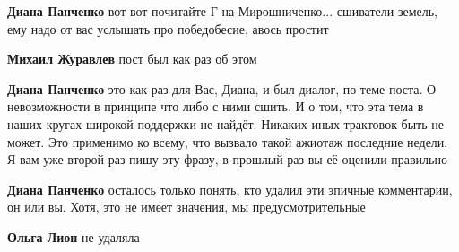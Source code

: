 \begin{itemize}
\begin{itemize}
 
\textbf{Диана Панченко} вот вот почитайте Г-на Мирошниченко... сшиватели земель, ему надо от вас услышать про победобесие, авось простит


 
\textbf{Михаил Журавлев} пост был как раз об этом

 
\textbf{Диана Панченко} это как раз для Вас, Диана, и был диалог, по теме
поста. О невозможности в принципе что либо с ними сшить. И о том, что эта тема
в наших кругах широкой поддержки не найдёт. Никаких иных трактовок быть не
может. Это применимо ко всему, что вызвало такой ажиотаж последние недели. Я
вам уже второй раз пишу эту фразу, в прошлый раз вы её оценили правильно

 
\textbf{Диана Панченко} осталось только понять, кто удалил эти эпичные комментарии, он или вы. Хотя, это не имеет значения, мы предусмотрительные


 
\textbf{Ольга Лион} не удаляла

 

\end{itemize}
\end{itemize}
